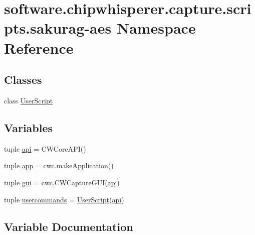 \hypertarget{namespacesoftware_1_1chipwhisperer_1_1capture_1_1scripts_1_1sakurag-aes}{}\section{software.\+chipwhisperer.\+capture.\+scripts.\+sakurag-\/aes Namespace Reference}
\label{namespacesoftware_1_1chipwhisperer_1_1capture_1_1scripts_1_1sakurag-aes}
\subsection*{Classes}
\begin{DoxyCompactItemize}
\item 
class \hyperlink{classsoftware_1_1chipwhisperer_1_1capture_1_1scripts_1_1sakurag-aes_1_1UserScript}{User\+Script}
\end{DoxyCompactItemize}
\subsection*{Variables}
\begin{DoxyCompactItemize}
\item 
tuple \hyperlink{namespacesoftware_1_1chipwhisperer_1_1capture_1_1scripts_1_1sakurag-aes_a0a6143af4cb02c4fc4effc737f95578b}{api} = C\+W\+Core\+A\+P\+I()
\item 
tuple \hyperlink{namespacesoftware_1_1chipwhisperer_1_1capture_1_1scripts_1_1sakurag-aes_a5c11107ac86d47d4fe6628b9e67acaad}{app} = cwc.\+make\+Application()
\item 
tuple \hyperlink{namespacesoftware_1_1chipwhisperer_1_1capture_1_1scripts_1_1sakurag-aes_a8034c90052e4725e000257765d5ff701}{gui} = cwc.\+C\+W\+Capture\+G\+U\+I(\hyperlink{namespacesoftware_1_1chipwhisperer_1_1capture_1_1scripts_1_1sakurag-aes_a0a6143af4cb02c4fc4effc737f95578b}{api})
\item 
tuple \hyperlink{namespacesoftware_1_1chipwhisperer_1_1capture_1_1scripts_1_1sakurag-aes_a92558e549001a1a6bc740a54bc8d27d0}{usercommands} = \hyperlink{classsoftware_1_1chipwhisperer_1_1capture_1_1scripts_1_1sakurag-aes_1_1UserScript}{User\+Script}(\hyperlink{namespacesoftware_1_1chipwhisperer_1_1capture_1_1scripts_1_1sakurag-aes_a0a6143af4cb02c4fc4effc737f95578b}{api})
\end{DoxyCompactItemize}


\subsection{Variable Documentation}
\hypertarget{namespacesoftware_1_1chipwhisperer_1_1capture_1_1scripts_1_1sakurag-aes_a0a6143af4cb02c4fc4effc737f95578b}{}
